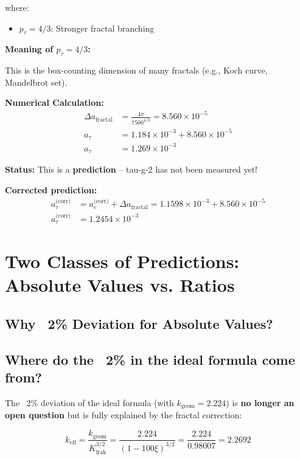 	where:
	\begin{itemize}
		\item $p_\tau = 4/3$: Stronger fractal branching
	\end{itemize}
	
	\textbf{Meaning of $p_\tau = 4/3$:}
	
	This is the box-counting dimension of many fractals (e.g., Koch curve, Mandelbrot set).
	
	\textbf{Numerical Calculation:}
	\begin{align}
		\Delta a_{\text{fractal}} &= \frac{4\pi}{7500^{4/3}} = 8.560 \times 10^{-5} \\
		a_\tau &= 1.184 \times 10^{-3} + 8.560 \times 10^{-5} \\
		a_\tau &= 1.269 \times 10^{-3}
	\end{align}
	
	\textbf{Status:} This is a \textbf{prediction} – tau-g-2 has not been measured yet!
	
	\textbf{Corrected prediction:}
	\begin{align}
		a_\tau^\text{(corr)} &= a_e^\text{(corr)} + \Delta a_\text{fractal} = 1.1598 \times 10^{-3} + 8.560 \times 10^{-5} \\
		a_\tau^\text{(corr)} &= 1.2454 \times 10^{-3}
	\end{align}
	
	\section{Two Classes of Predictions: Absolute Values vs. Ratios}
	
	\subsection{Why ~2\% Deviation for Absolute Values?}
	
	\subsection{Where do the ~2\% in the ideal formula come from?}
	
	The ~2\% deviation of the ideal formula (with $k_\text{geom} = 2.224$) is \textbf{no longer an open question} but is fully explained by the fractal correction:
	
	\begin{equation}
		k_\text{eff} = \frac{k_\text{geom}}{K_\text{frak}^{3/2}} = \frac{2.224}{(1-100\xi)^{3/2}} = \frac{2.224}{0.98007} = 2.2692
	\end{equation}
	
